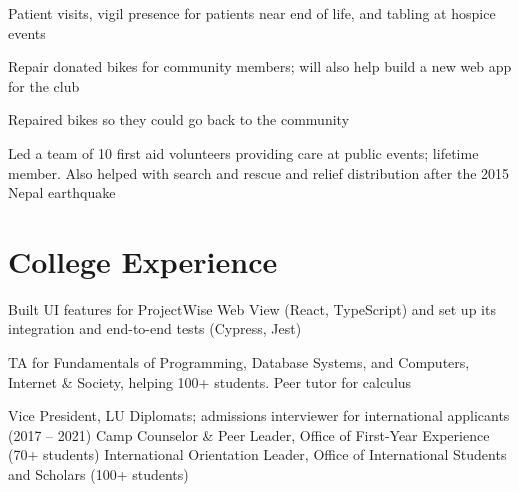 \documentclass[]{deedy-resume-openfont}
\begin{document}
\begin{minipage}[t]{0.66\textwidth}
Patient visits, vigil presence for patients near end of life, and tabling at hospice events
\sectionsep

Repair donated bikes for community members; will also help build a new web app for the club
\sectionsep

Repaired bikes so they could go back to the community
\sectionsep

Led a team of 10 first aid volunteers providing care at public events; lifetime member. Also helped with search and rescue and relief distribution after the 2015 Nepal earthquake
\sectionsep


\section{College Experience}

Built UI features for ProjectWise Web View (React, TypeScript) and set up its integration and end-to-end tests (Cypress, Jest)
\sectionsep

TA for Fundamentals of Programming, Database Systems, and Computers, Internet \& Society, helping 100+ students. Peer tutor for calculus
\sectionsep

\descript{}
Vice President, LU Diplomats; admissions interviewer for international applicants (2017 – 2021) \textbullet{} Camp Counselor \& Peer Leader, Office of First-Year Experience (70+ students) \textbullet{} International Orientation Leader, Office of International Students and Scholars (100+ students)

\end{minipage}
\end{document}
